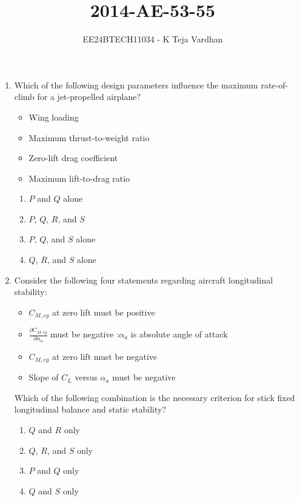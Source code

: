 \documentclass[journal]{IEEEtran}
\begin{document}

\title{2014-AE-53-55}
\author{EE24BTECH11034 - K Teja Vardhan}
{\let\newpage\relax\maketitle}


\begin{enumerate}



\item Which of the following design parameters influence the maximum rate-of-climb for a jet-propelled airplane?

\begin{itemize}
    \item Wing loading
    \item Maximum thrust-to-weight ratio
    \item Zero-lift drag coefficient
    \item Maximum lift-to-drag ratio
\end{itemize}

\begin{enumerate}
    \item $P$ and $Q$ alone
    \item $P$, $Q$, $R$, and $S$
    \item $P$, $Q$, and $S$ alone
    \item $Q$, $R$, and $S$ alone
\end{enumerate}

\item Consider the following four statements regarding aircraft longitudinal stability:

\begin{itemize}
    \item $C_{M,cg}$ at zero lift must be positive
    \item $\frac{\partial C_{M,cg}}{\partial \alpha_a}$ must be negative :$\alpha_a$ is absolute angle of attack
    \item $C_{M,cg}$ at zero lift must be negative
    \item Slope of $C_L$ versus $\alpha_a$ must be negative
\end{itemize}

Which of the following combination is the necessary criterion for stick fixed longitudinal balance and static stability?


\begin{enumerate}
    \item $Q$ and $R$ only
    \item $Q$, $R$, and $S$ only
    \item $P$ and $Q$ only
    \item $Q$ and $S$ only
\end{enumerate}


\end{enumerate}
\end{document}
